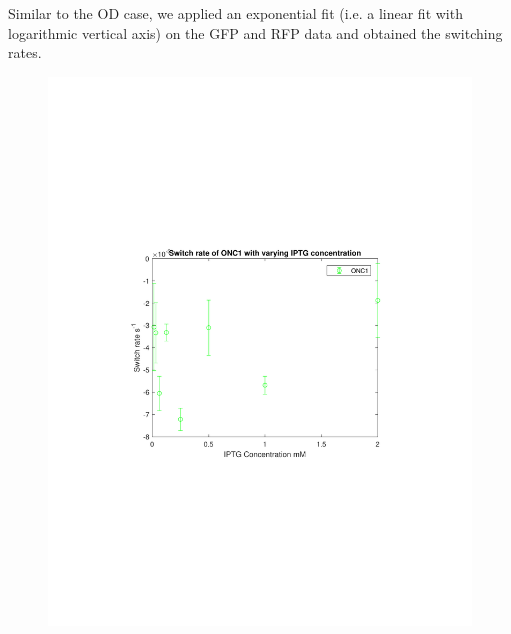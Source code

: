 \documentclass[11pt]{book}
\begin{document}
Similar to the OD case, we applied an exponential fit (i.e. a linear fit with logarithmic vertical axis) on the GFP and RFP data and obtained the switching rates. 



\begin{figure}[h]
\centering
\includegraphics[scale=0.8]{ONC1switchrate.pdf}
\caption{}
\label{fig:onc1SwitchRate}
\end{figure}
\end{document}
